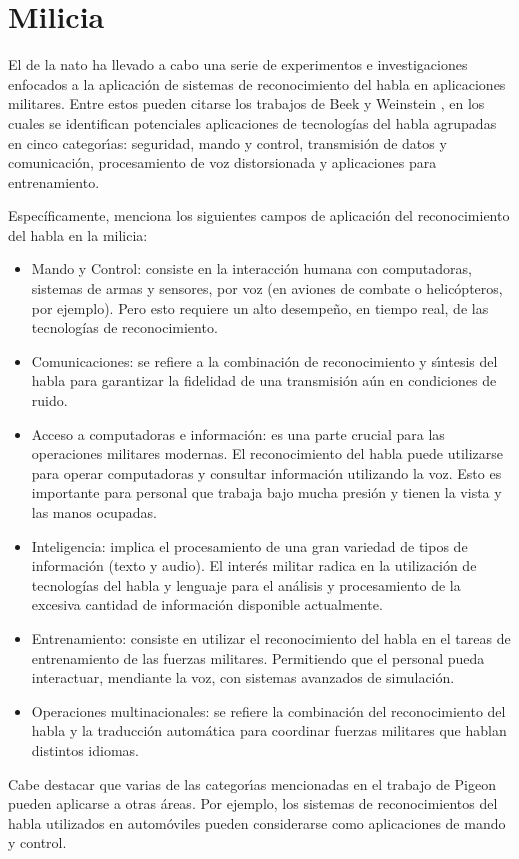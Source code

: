 \section{Milicia}
\label{sec:milicia}

El  de la \gls{nato} ha llevado a cabo una serie de experimentos e investigaciones
enfocados a la aplicaci\'on de sistemas de reconocimiento del habla en aplicaciones militares.
Entre estos pueden citarse los trabajos de Beek \cite{BeekAn1977} y Weinstein \cite{WeinsteinOpportunities1991},
en los cuales se identifican potenciales aplicaciones de tecnolog\'ias del habla agrupadas en cinco categor{\'\i}as:
seguridad, mando y control, transmisi\'on de datos y comunicaci\'on, procesamiento de voz distorsionada
y aplicaciones para entrenamiento.

Espec\'ificamente, \cite{PigeonUse2006} menciona los siguientes campos de aplicaci\'on del reconocimiento 
del habla en la milicia:

\begin{itemize}
    \item Mando y Control: consiste en la interacci\'on humana con computadoras, sistemas
	de armas y sensores, por voz (en aviones de combate o helic\'opteros, por ejemplo). Pero esto
	requiere un alto desempe\~no, en tiempo real, de las tecnolog\'ias de reconocimiento.
	\item Comunicaciones: se refiere a la combinaci\'on de reconocimiento y s{\'\i}ntesis del habla para
	garantizar la fidelidad de una transmisi\'on a\'un en condiciones de ruido.
    \item Acceso a computadoras e informaci\'on: es una parte crucial para las operaciones militares modernas. El
	reconocimiento del habla puede utilizarse para operar computadoras y consultar informaci\'on utilizando la voz.
	Esto es importante para personal que trabaja bajo mucha presi\'on y tienen la vista y las manos ocupadas.
    \item Inteligencia: implica el procesamiento de una gran variedad de tipos de informaci\'on (texto y audio). 
    El inter\'es militar radica en la utilizaci\'on de tecnolog\'ias del habla y lenguaje para el an\'alisis y
    procesamiento de la excesiva cantidad de informaci\'on disponible actualmente.
    \item Entrenamiento: consiste en utilizar el reconocimiento del habla en el tareas de entrenamiento de las fuerzas
	militares. Permitiendo que el personal pueda interactuar, mendiante la voz, con sistemas avanzados de simulaci\'on.
	\item Operaciones multinacionales: se refiere la combinaci\'on del reconocimiento del habla y la traducci\'on
	autom\'atica para coordinar fuerzas militares que hablan distintos idiomas.
\end{itemize}

Cabe destacar que varias de las categor{\'\i}as mencionadas en el trabajo de Pigeon pueden aplicarse
a otras \'areas. Por ejemplo, los sistemas de reconocimientos del habla utilizados en autom\'oviles 
pueden considerarse como aplicaciones de mando y control.